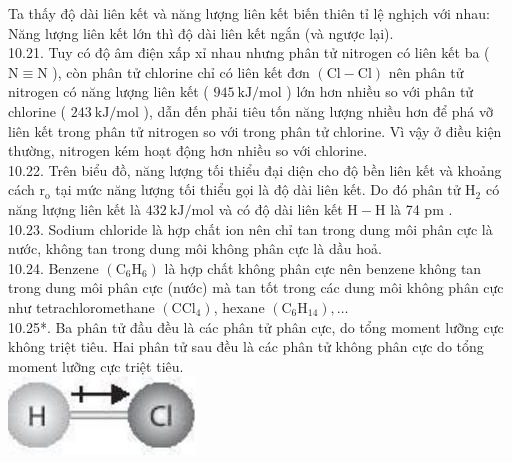 \documentclass[10pt]{article}
\begin{document}
Ta thấy độ dài liên kết và năng lượng liên kết biến thiên tỉ lệ nghịch với nhau: Năng lượng liên kết lớn thì độ dài liên kết ngắn (và ngược lại).\\
10.21. Tuy có độ âm điện xấp xỉ nhau nhưng phân tử nitrogen có liên kết ba ( $\mathrm{N} \equiv \mathrm{N}$ ), còn phân tử chlorine chỉ có liên kết đơn $(\mathrm{Cl}-\mathrm{Cl})$ nên phân tử nitrogen có năng lượng liên kết ( $945 \mathrm{~kJ} / \mathrm{mol}$ ) lớn hơn nhiều so với phân tử chlorine ( $243 \mathrm{~kJ} / \mathrm{mol}$ ), dẫn đến phải tiêu tốn năng lượng nhiều hơn để phá vỡ liên kết trong phân tử nitrogen so với trong phân tử chlorine. Vì vậy ở điều kiện thường, nitrogen kém hoạt động hơn nhiều so với chlorine.\\
10.22. Trên biểu đồ, năng lượng tối thiểu đại diện cho độ bền liên kết và khoảng cách $\mathrm{r}_{\mathrm{o}}$ tại mức năng lượng tối thiểu gọi là độ dài liên kết. Do đó phân tử $\mathrm{H}_{2}$ có năng lượng liên kết là $432 \mathrm{~kJ} / \mathrm{mol}$ và có độ dài liên kết $\mathrm{H}-\mathrm{H}$ là 74 pm .\\
10.23. Sodium chloride là hợp chất ion nên chỉ tan trong dung môi phân cực là nước, không tan trong dung môi không phân cực là dầu hoả.\\
10.24. Benzene $\left(\mathrm{C}_{6} \mathrm{H}_{6}\right)$ là hợp chất không phân cực nên benzene không tan trong dung môi phân cực (nước) mà tan tốt trong các dung môi không phân cực như tetrachloromethane $\left(\mathrm{CCl}_{4}\right)$, hexane $\left(\mathrm{C}_{6} \mathrm{H}_{14}\right), \ldots$\\
10.25*. Ba phân tử đầu đều là các phân tử phân cực, do tổng moment lưỡng cực không triệt tiêu. Hai phân tử sau đều là các phân tử không phân cực do tổng moment lưỡng cực triệt tiêu.\\
\includegraphics[max width=\textwidth, center]{2025_10_23_57761e23b8c46a11c3efg-27}\\
\end{document}
